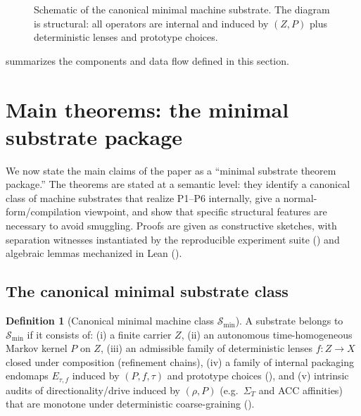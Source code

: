 \documentclass[11pt]{article}
\theoremstyle{definition}
\newtheorem{definition}[theorem]{Definition}
\theoremstyle{remark}
\begin{document}
\begin{figure}[t]
  \centering
  \caption{Schematic of the canonical minimal machine substrate. The diagram is structural: all operators are internal and induced by $(Z,P)$ plus deterministic lenses and prototype choices.}
  \label{fig:canonical-machine}
\end{figure}

\noindent
{} summarizes the components and data flow defined in this section.
 \section{Main theorems: the minimal substrate package}
\label{sec:theorems}

We now state the main claims of the paper as a ``minimal substrate theorem package.''
The theorems are stated at a semantic level: they identify a canonical class of machine substrates that realize P1--P6 internally, give a normal-form/compilation viewpoint, and show that specific structural features are necessary to avoid smuggling.
Proofs are given as constructive sketches, with separation witnesses instantiated by the reproducible experiment suite () and algebraic lemmas mechanized in Lean ().

\subsection{The canonical minimal substrate class}

\begin{definition}[Canonical minimal machine class $\mathcal S_{\min}$]
\label{def:smin}
A substrate belongs to $\mathcal S_{\min}$ if it consists of:
(i) a finite carrier $Z$,
(ii) an autonomous time-homogeneous Markov kernel $P$ on $Z$,
(iii) an admissible family of deterministic lenses $f:Z\to X$ closed under composition (refinement chains),
(iv) a family of internal packaging endomaps $E_{\tau,f}$ induced by $(P,f,\tau)$ and prototype choices (),
and (v) intrinsic audits of directionality/drive induced by $(\rho,P)$ (e.g.\ $\Sigma_T$ and ACC affinities) that are monotone under deterministic coarse-graining ().
\end{definition}
\end{document}
